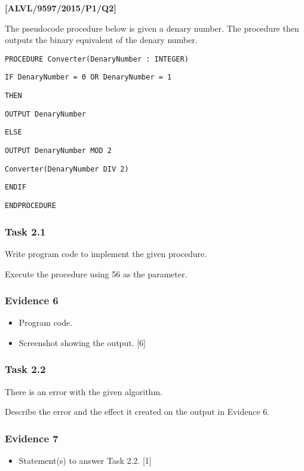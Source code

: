 \item \textbf{{[}ALVL/9597/2015/P1/Q2{]} }

The pseudocode procedure below is given a denary number. The procedure
then outputs the binary equivalent of the denary number.

\noindent %
\noindent\begin{minipage}[t]{1\columnwidth}%
\texttt{PROCEDURE Converter(DenaryNumber : INTEGER) }

\texttt{\qquad{}IF DenaryNumber = 0 OR DenaryNumber = 1 }

\texttt{\qquad{}\qquad{}THEN }

\texttt{\qquad{}\qquad{}\qquad{}OUTPUT DenaryNumber }

\texttt{\qquad{}\qquad{}ELSE }

\texttt{\qquad{}\qquad{}\qquad{}OUTPUT DenaryNumber MOD 2 }

\texttt{\qquad{}\qquad{}\qquad{}Converter(DenaryNumber DIV 2) }

\texttt{\qquad{}ENDIF }

\texttt{ENDPROCEDURE}%
\end{minipage}

\subsubsection*{Task 2.1}

Write program code to implement the given procedure. 

Execute the procedure using 56 as the parameter. 

\subsubsection*{Evidence 6}
\begin{itemize}
\item Program code. 
\item Screenshot showing the output. \hfill{}{[}6{]}
\end{itemize}

\subsubsection*{Task 2.2}

There is an error with the given algorithm. 

Describe the error and the effect it created on the output in Evidence
6. 

\subsubsection*{Evidence 7}
\begin{itemize}
\item Statement(s) to answer Task 2.2. \hfill{}{[}1{]}
\end{itemize}

